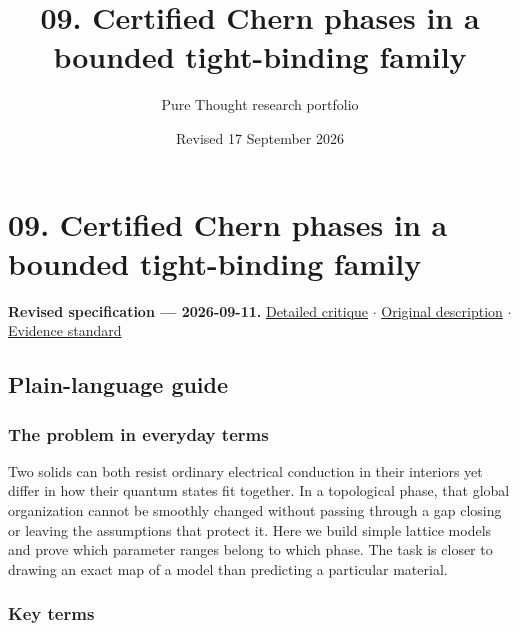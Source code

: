 \documentclass[
  11pt,
]{article}
\title{09. Certified Chern phases in a bounded tight-binding family}
\author{Pure Thought research portfolio}
\date{Revised 17 September 2026}
\begin{document}
\maketitle
\thispagestyle{empty}
\clearpage

\section{09. Certified Chern phases in a bounded tight-binding family}

\textbf{Revised specification --- 2026-09-11.}
\href{https://github.com/rick-stevens-ai/Pure-Thought/blob/main/reviews/09-Topological-Band-Theory.md}{Detailed
critique} \ensuremath{\cdot}
\href{https://github.com/rick-stevens-ai/Pure-Thought/blob/main/archive/original-PRDs/09-Topological-Band-Theory.md}{Original
description} \ensuremath{\cdot}
\href{https://github.com/rick-stevens-ai/Pure-Thought/blob/main/reviews/EVIDENCE-STANDARD.md}{Evidence
standard}

\subsection{Plain-language guide}

\subsubsection{The problem in everyday terms}

Two solids can both resist ordinary electrical conduction in their
interiors yet differ in how their quantum states fit together. In a
topological phase, that global organization cannot be smoothly changed
without passing through a gap closing or leaving the assumptions that
protect it. Here we build simple lattice models and prove which
parameter ranges belong to which phase. The task is closer to drawing an
exact map of a model than predicting a particular material.

\subsubsection{Key terms}
\end{document}

